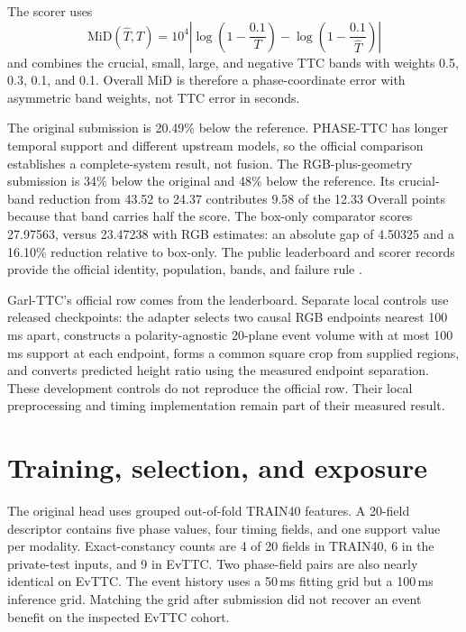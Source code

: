 The scorer uses
\begin{equation}
 \mathrm{MiD}(\widehat T,T)=10^4\left|\log\left(1-\frac{0.1}{T}\right)
 -\log\left(1-\frac{0.1}{\widehat T}\right)\right|
\end{equation}
and combines the crucial, small, large, and negative TTC bands with weights 0.5, 0.3, 0.1, and 0.1. Overall MiD is therefore a phase-coordinate error with asymmetric band weights, not TTC error in seconds.

The original submission is 20.49\% below the reference. PHASE-TTC has longer temporal support and different upstream models, so the official comparison establishes a complete-system result, not fusion. The RGB-plus-geometry submission is 34\% below the original and 48\% below the reference. Its crucial-band reduction from 43.52 to 24.37 contributes 9.58 of the 12.33 Overall points because that band carries half the score. The box-only comparator scores 27.97563, versus 23.47238 with RGB estimates: an absolute gap of 4.50325 and a 16.10\% reduction relative to box-only. The public leaderboard and scorer records provide the official identity, population, bands, and failure rule \citep{codabench2026,garlscorer2026}.

Garl-TTC's official row comes from the leaderboard. Separate local controls use released checkpoints: the adapter selects two causal RGB endpoints nearest 100\,ms apart, constructs a polarity-agnostic 20-plane event volume with at most 100\,ms support at each endpoint, forms a common square crop from supplied regions, and converts predicted height ratio using the measured endpoint separation. These development controls do not reproduce the official row. Their local preprocessing and timing implementation remain part of their measured result.

\section{Training, selection, and exposure}

The original head uses grouped out-of-fold TRAIN40 features. A 20-field descriptor contains five phase values, four timing fields, and one support value per modality. Exact-constancy counts are 4 of 20 fields in TRAIN40, 6 in the private-test inputs, and 9 in EvTTC. Two phase-field pairs are also nearly identical on EvTTC. The event history uses a 50\,ms fitting grid but a 100\,ms inference grid. Matching the grid after submission did not recover an event benefit on the inspected EvTTC cohort.

